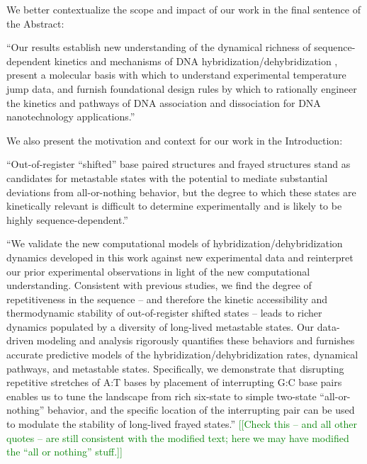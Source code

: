 \documentclass[11pt,a4paper]{letter} %
\newcommand*{\rood}[1]{{\color{red}{#1}}}
\newcommand*{\noteg}[1]{\textcolor{green}{[[#1]]}}		%
\begin{document}
We better contextualize the scope and impact of our work in the final sentence of the Abstract:

``Our results establish new understanding of the dynamical richness of sequence-dependent kinetics and mechanisms of DNA hybridization/dehybridization \rood{by furnishing quantitative and predictive kinetic models of the dynamical transition network between metastable states}, present a molecular basis with which to understand experimental temperature jump data, and furnish foundational design rules by which to rationally engineer the kinetics and pathways of DNA association and dissociation for DNA nanotechnology applications.''

We also present the motivation and context for our work in the Introduction:

``Out-of-register ``shifted'' base paired structures \citep{Flamm2000RNAResolution, Romano2013DNADependence, Hinckley2014Coarse-grainedEffects, Maciejczyk2014DNAModel, Araque2016LatticeCooperativity, Xiao2019} and frayed structures \citep{Zgarbova2014BaseRNA, Nonin1995TerminalFraying, Nikolova2012ProbingSimulations, Andreatta2006UltrafastHelix} stand as candidates for metastable states with the potential to mediate substantial deviations from all-or-nothing behavior, but the degree to which these states are kinetically relevant is difficult to determine experimentally and is likely to be highly sequence-dependent.''

``We validate the new computational models of hybridization/dehybridization dynamics developed in this work against new experimental data and reinterpret our prior experimental observations in light of the new computational understanding. Consistent with previous studies, \citep{Hinckley2014Coarse-grainedEffects,Romano2013DNADependence,Araque2016LatticeCooperativity} we find the degree of repetitiveness in the sequence -- and therefore the kinetic accessibility and thermodynamic stability of out-of-register shifted states -- leads to richer dynamics populated by a diversity of long-lived metastable states. Our data-driven modeling and analysis rigorously quantifies these behaviors and furnishes accurate predictive models of the hybridization/dehybridization rates, dynamical pathways, and metastable states. Specifically, we demonstrate that disrupting repetitive stretches of A:T bases by placement of interrupting G:C base pairs enables us to tune the landscape from rich six-state to simple two-state ``all-or-nothing'' behavior, and the specific location of the interrupting pair can be used to modulate the stability of long-lived frayed states.'' \noteg{Check this -- and all other quotes -- are still consistent with the modified text; here we may have modified the ``all or nothing'' stuff.}
\end{document}

